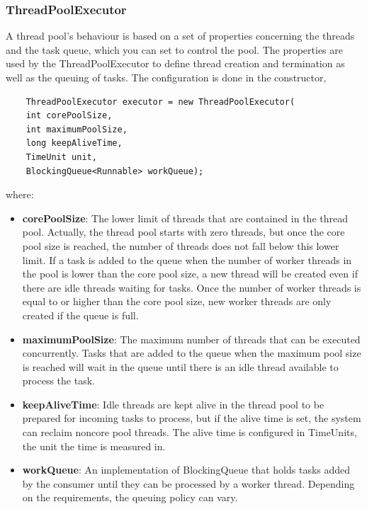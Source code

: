\subsubsection{ThreadPoolExecutor}
A thread pool’s behaviour is based on a set of properties concerning the threads and the task queue, which you can set to control the pool. The properties are used by the ThreadPoolExecutor to define thread creation and termination as well as the queuing of tasks. The configuration is done in the constructor,
\begin{lstlisting}
	ThreadPoolExecutor executor = new ThreadPoolExecutor(
	int corePoolSize,
	int maximumPoolSize,
	long keepAliveTime,
	TimeUnit unit,
	BlockingQueue<Runnable> workQueue);
\end{lstlisting}
where:
\begin{itemize}
	\item \textbf{corePoolSize}: The lower limit of threads that are contained in the thread pool. Actually, the thread pool starts with zero threads, but once the core pool size is reached, the number of threads does not fall below this lower limit. If a task is added to the queue when the number of worker threads in the pool is lower than the core pool size, a new thread will be created even if there are idle threads waiting for tasks. Once the number of worker threads is equal to or higher than the core pool size, new worker threads are only created if the queue is full.
	\item \textbf{maximumPoolSize}: The maximum number of threads that can be executed concurrently. Tasks that are added to the queue when the maximum pool size is reached will wait in the queue until there is an idle thread available to process the task.
	\item \textbf{keepAliveTime}: Idle threads are kept alive in the thread pool to be prepared for incoming tasks to process, but if the alive time is set, the system can reclaim noncore pool threads. The alive time is configured in TimeUnits, the unit the time is measured in.
	\item \textbf{workQueue}: An implementation of BlockingQueue that holds tasks added by the consumer until they can be processed by a worker thread. Depending on the requirements, the queuing policy can vary.
\end{itemize}


